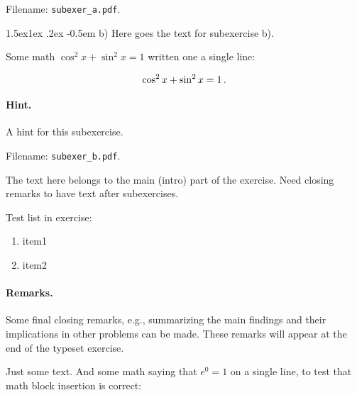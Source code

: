 \documentclass[%
oneside,                 %
final,                   %
10pt]{article}
\makeatletter
\newenvironment{doconceexercise}{}{}
\newcommand\subex{\@startsection{paragraph}{4}{\z@}%
                  {1.5ex\@plus1ex \@minus.2ex}%
                  {-0.5em}%
                  {\normalfont\normalsize\bfseries}}
\theoremstyle{definition}
\makeatother
\begin{document}
\begin{enumerate}
\begin{doconceexercise}
\noindent
\noindent Filename: \Verb!subexer_a.pdf!.


\subex{b)}
Here goes the text for subexercise b).

Some math $\cos^2 x + \sin^2 x = 1$ written one a single line:

\[ \cos^2 x + \sin^2 x = 1 \thinspace .\]


\paragraph{Hint.}
A hint for this subexercise.

\noindent Filename: \Verb!subexer_b.pdf!.


The text here belongs to the main (intro) part of the exercise. Need
closing remarks to have text after subexercises.

Test list in exercise:

\begin{enumerate}
\item item1

\item item2
\end{enumerate}

\noindent
\paragraph{Remarks.}
Some final closing remarks, e.g., summarizing the main findings
and their implications in other problems can be made. These
remarks will appear at the end of the typeset exercise.

\end{doconceexercise}

\begin{doconceexercise}



Just some text. And some math saying that $e^0=1$ on a single line,
to test that math block insertion is correct:


\end{doconceexercise}
\end{enumerate}
\end{document}
